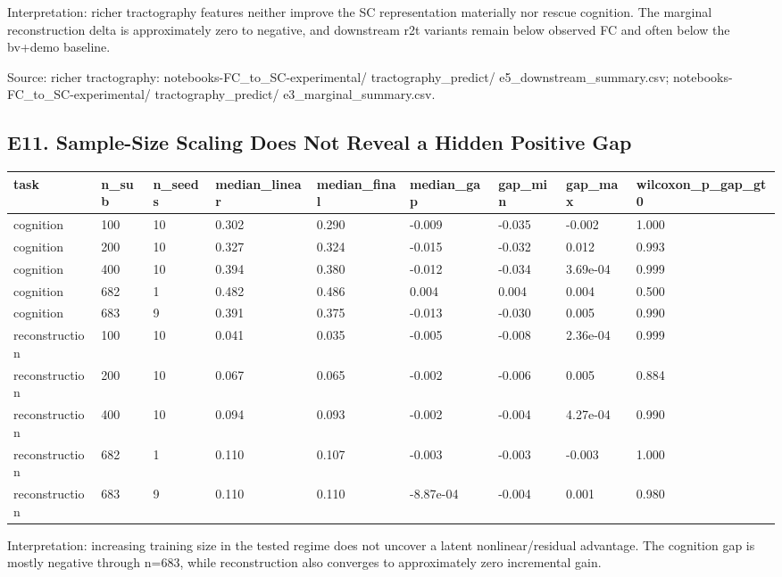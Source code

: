 Interpretation: richer tractography features neither improve the SC representation materially nor rescue cognition. The marginal reconstruction delta is approximately zero to negative, and downstream r2t variants remain below observed FC and often below the bv+demo baseline.

Source: richer tractography: notebooks-FC\_to\_SC-experimental/ tractography\_predict/ e5\_downstream\_summary.csv; notebooks-FC\_to\_SC-experimental/ tractography\_predict/ e3\_marginal\_summary.csv.

\subsection{E11. Sample-Size Scaling Does Not Reveal a Hidden Positive Gap}\label{e11-sample-size-scaling-does-not-reveal-a-hidden-positive-gap}

{\def\LTcaptype{none} %
\begin{longtable}[]{@{}lllllllll@{}}
\toprule\noalign{}
task & n\_sub & n\_seeds & median\_linear & median\_final & median\_gap & gap\_min & gap\_max & wilcoxon\_p\_gap\_gt0 \\
\midrule\noalign{}
\endhead
\bottomrule\noalign{}
\endlastfoot
cognition & 100 & 10 & 0.302 & 0.290 & -0.009 & -0.035 & -0.002 & 1.000 \\
cognition & 200 & 10 & 0.327 & 0.324 & -0.015 & -0.032 & 0.012 & 0.993 \\
cognition & 400 & 10 & 0.394 & 0.380 & -0.012 & -0.034 & 3.69e-04 & 0.999 \\
cognition & 682 & 1 & 0.482 & 0.486 & 0.004 & 0.004 & 0.004 & 0.500 \\
cognition & 683 & 9 & 0.391 & 0.375 & -0.013 & -0.030 & 0.005 & 0.990 \\
reconstruction & 100 & 10 & 0.041 & 0.035 & -0.005 & -0.008 & 2.36e-04 & 0.999 \\
reconstruction & 200 & 10 & 0.067 & 0.065 & -0.002 & -0.006 & 0.005 & 0.884 \\
reconstruction & 400 & 10 & 0.094 & 0.093 & -0.002 & -0.004 & 4.27e-04 & 0.990 \\
reconstruction & 682 & 1 & 0.110 & 0.107 & -0.003 & -0.003 & -0.003 & 1.000 \\
reconstruction & 683 & 9 & 0.110 & 0.110 & -8.87e-04 & -0.004 & 0.001 & 0.980 \\
\end{longtable}
}

Interpretation: increasing training size in the tested regime does not uncover a latent nonlinear/residual advantage. The cognition gap is mostly negative through n=683, while reconstruction also converges to approximately zero incremental gain.

